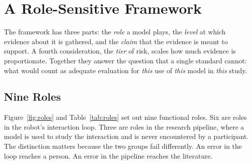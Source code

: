 \section{A Role-Sensitive Framework}
\label{sec:framework}

The framework has three parts: the \emph{role} a model plays, the \emph{level}
at which evidence about it is gathered, and the \emph{claim} that the evidence
is meant to support. A fourth consideration, the \emph{tier} of risk, scales
how much evidence is proportionate. Together they answer the question that a
single standard cannot: what would count as adequate evaluation for
\emph{this} use of \emph{this} model in \emph{this} study.

\subsection{Nine Roles}
\label{sec:roles}

Figure~\ref{fig:roles} and Table~\ref{tab:roles} set out nine functional
roles. Six are roles in the robot's interaction loop. Three are roles in the
research pipeline, where a model is used to study the interaction and is never
encountered by a participant. The distinction matters because the two groups
fail differently. An error in the loop reaches a person. An error in the
pipeline reaches the literature.



